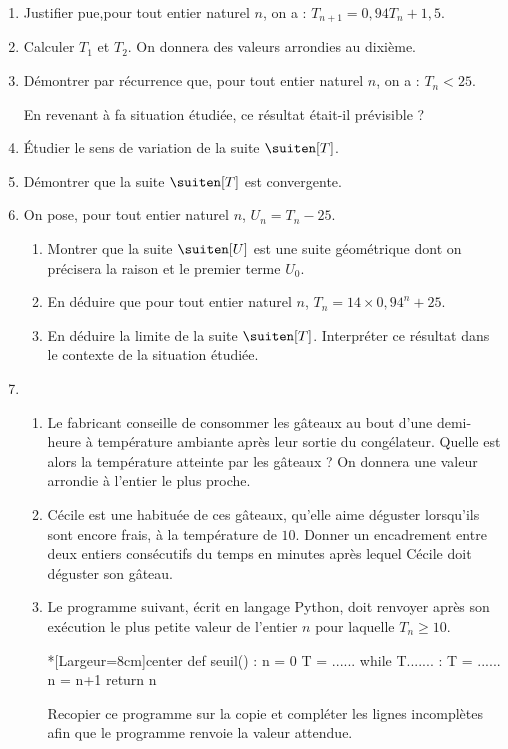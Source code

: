 \begin{enumerate}
	\item Justifier pue,pour tout entier naturel $n$, on a : $T_{n+1} = 0,94T_n + 1,5$.
	\item Calculer $T_1$ et $T_2$. On donnera des valeurs arrondies au dixième.
	\item Démontrer par récurrence que, pour tout entier naturel $n$, on a : $T_n < 25$.
	
	En revenant à fa situation étudiée, ce résultat était-il prévisible ?
	\item Étudier le sens de variation de la suite $\suiten[T]$.
	\item Démontrer que la suite $\suiten[T]$ est convergente.
	\item On pose, pour tout entier naturel $n$, $U_n = T_n - 25$.
	\begin{enumerate}
		\item Montrer que la suite $\suiten[U]$ est une suite géométrique dont on précisera la raison et le premier terme $U_0$.
		\item En déduire que pour tout entier naturel $n$, $T_n = 14 \times 0,94^n + 25$.
		\item En déduire la limite de la suite $\suiten[T]$. Interpréter ce résultat dans le contexte de la situation étudiée.
	\end{enumerate}
	\item 
	\begin{enumerate}
		\item Le fabricant conseille de consommer les gâteaux au bout d'une demi-heure à température ambiante après leur sortie du congélateur. Quelle est alors la température atteinte par les gâteaux ? On donnera une valeur arrondie à l'entier le plus proche.
		\item Cécile est une habituée de ces gâteaux, qu'elle aime déguster lorsqu'ils sont encore frais, à la température de $10$\textcelsius{}. Donner un encadrement entre deux entiers consécutifs du temps en minutes après lequel Cécile doit déguster son gâteau.
		\item Le programme suivant, écrit en langage \textsf{Python}, doit renvoyer après son exécution le plus petite valeur de l'entier $n$ pour laquelle $T_n \geqslant 10$.
		
		\smallskip
		
		\begin{minipage}{0.5\linewidth}
\begin{CodePythonLstAlt}*[Largeur=8cm]{center}
def seuil() :
	n = 0
	T = ......
	while T....... :
		T = ......
		n = n+1
	return n
\end{CodePythonLstAlt}
		\end{minipage}\hfill
		\begin{minipage}{0.33\linewidth}
			Recopier ce programme sur la copie et compléter les lignes incomplètes afin que le programme renvoie la valeur attendue.
		\end{minipage}\hfill~
	\end{enumerate}
\end{enumerate}

